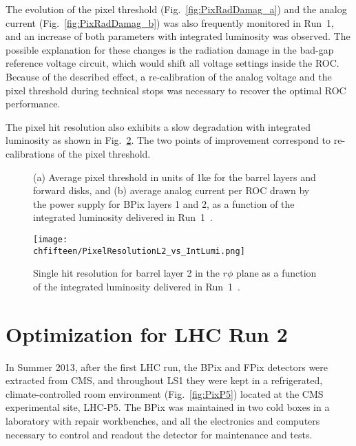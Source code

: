 The evolution of the pixel threshold (Fig.~\ref{fig:PixRadDamag_a}) and the analog current (Fig.~\ref{fig:PixRadDamag_b}) was also frequently monitored in Run~1,
and an increase of both parameters with integrated luminosity was observed.
The possible explanation for these changes is the radiation damage in the bad-gap reference voltage circuit, which would shift all voltage settings inside the ROC.
Because of the described effect, a re-calibration of the analog voltage and the pixel threshold during technical stops was necessary to recover the optimal ROC performance.

The pixel hit resolution also exhibits a slow degradation with integrated luminosity as shown in Fig.~\ref{fig:PixRelvsLumi}. The two points of improvement correspond to re-calibrations of the pixel threshold.

\begin{figure}[!htb]
 \begin{center}
 \end{center}
 \caption{(a) Average pixel threshold in units of 1\unit{ke} for the barrel layers and forward disks, and (b) average analog current per ROC drawn by the power supply for BPix layers 1 and 2, as a function of the integrated luminosity delivered in Run~1~\cite{PixelOffline}.}
 \label{fig:PixRadDamag}
\end{figure}

\begin{figure}[!htb]
 \begin{center}
 \texttt{[image: \\chfifteen/PixelResolutionL2\_vs\_IntLumi.png]}
 \end{center}
 \caption{Single hit resolution for barrel layer 2 in the $r\phi$ plane as a function of the integrated luminosity delivered in Run~1~\cite{PixelOffline}.}
 \label{fig:PixRelvsLumi}
\end{figure}

\section{Optimization for LHC Run 2}

In Summer 2013, after the first LHC run, the BPix and FPix detectors were extracted from CMS, and throughout LS1 they were kept in a refrigerated, climate-controlled room environment (Fig.~\ref{fig:PixP5}) located at the CMS experimental site, LHC-P5. The BPix was maintained in two cold boxes in a laboratory with repair workbenches, and all the electronics and computers necessary to control and readout the detector for maintenance and tests.

